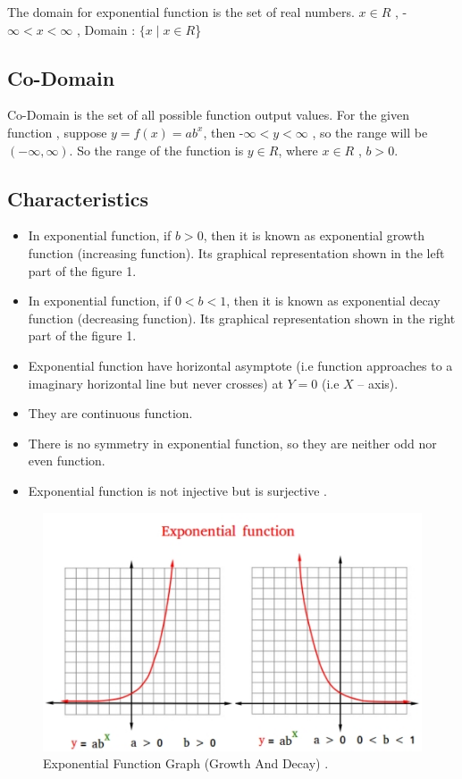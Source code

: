 \documentclass[12pt, a4paper]{article}
\begin{document}
The domain for exponential function is the set of real numbers. 
\newline $x \in R$ ,  -$\infty < x <\infty$ , Domain : $\{x \mid x \in R$\}

\subsection{Co-Domain}

Co-Domain is the set of all possible function output values.
\newline For the given function , suppose $y = f(x) = ab^x $, then -$\infty < y <\infty$ , so the range will be $(-\infty,\infty)$. So the range of the function is $y \in R $, where $x \in R$ , $ b > 0 $.

\subsection{Characteristics}
\begin{itemize}
    \item In exponential function, if $ b > 0 $, then it is known as exponential growth function (increasing function). Its graphical representation shown in the left part of the figure 1.
    \item In exponential function, if $ 0 < b < 1$, then it is known as exponential decay function (decreasing function). Its graphical representation shown in the right part of the figure 1.
    \item Exponential function have horizontal asymptote (i.e function approaches to a imaginary horizontal line but never crosses) at $ Y=0 $ (i.e $ X $ – axis).
    \item They are continuous function.
    \item There is no symmetry in exponential function, so they are neither odd nor even function.
    \item Exponential function is not injective but is surjective \cite{Injectivity and Surjectivity of Exponential Function}.
\end{itemize}

\newpage

\begin{figure}[h]
  \includegraphics[width=\linewidth]{exponential-function.jpg}
  \caption{Exponential Function Graph (Growth And Decay) \cite{Exponential Function Graph}.}
  \label{fig:exponential function graph (growth and decay)}
\end{figure}
\end{document}
